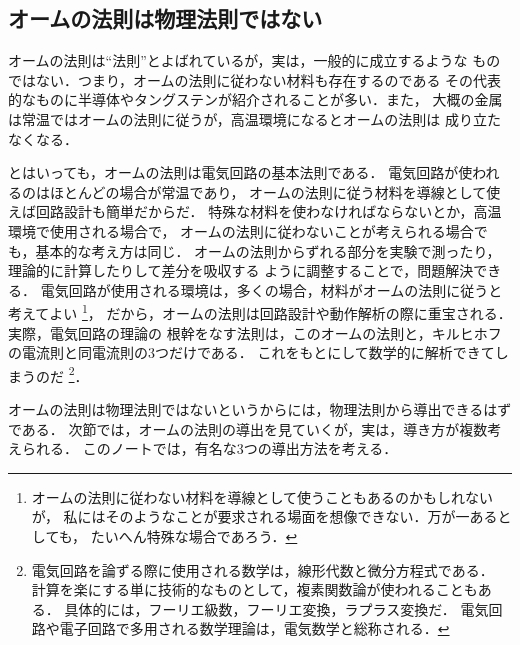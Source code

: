         \subsection{オームの法則は物理法則ではない}
            オームの法則は“法則”とよばれているが，実は，一般的に成立するような
            ものではない．つまり，オームの法則に従わない材料も存在するのである
            その代表的なものに半導体やタングステンが紹介されることが多い．また，
            大概の金属は常温ではオームの法則に従うが，高温環境になるとオームの法則は
            成り立たなくなる．

            とはいっても，オームの法則は電気回路の基本法則である．
            電気回路が使われるのはほとんどの場合が常温であり，
            オームの法則に従う材料を導線として使えば回路設計も簡単だからだ．
            特殊な材料を使わなければならないとか，高温環境で使用される場合で，
            オームの法則に従わないことが考えられる場合でも，基本的な考え方は同じ．
            オームの法則からずれる部分を実験で測ったり，理論的に計算したりして差分を吸収する
            ように調整することで，問題解決できる．
            電気回路が使用される環境は，多くの場合，材料がオームの法則に従うと考えてよい
            \footnote{
                オームの法則に従わない材料を導線として使うこともあるのかもしれないが，
                私にはそのようなことが要求される場面を想像できない．万が一あるとしても，
                たいへん特殊な場合であろう．
            }，
            だから，オームの法則は回路設計や動作解析の際に重宝される．実際，電気回路の理論の
            根幹をなす法則は，このオームの法則と，キルヒホフの電流則と同電流則の3つだけである．
            これをもとにして数学的に解析できてしまうのだ
            \footnote{
                電気回路を論ずる際に使用される数学は，線形代数と微分方程式である．
                計算を楽にする単に技術的なものとして，複素関数論が使われることもある．
                具体的には，フーリエ級数，フーリエ変換，ラプラス変換だ．
                電気回路や電子回路で多用される数学理論は，電気数学と総称される．
            }．

            オームの法則は物理法則ではないというからには，物理法則から導出できるはずである．
            次節では，オームの法則の導出を見ていくが，実は，導き方が複数考えられる．
            このノートでは，有名な3つの導出方法を考える．

